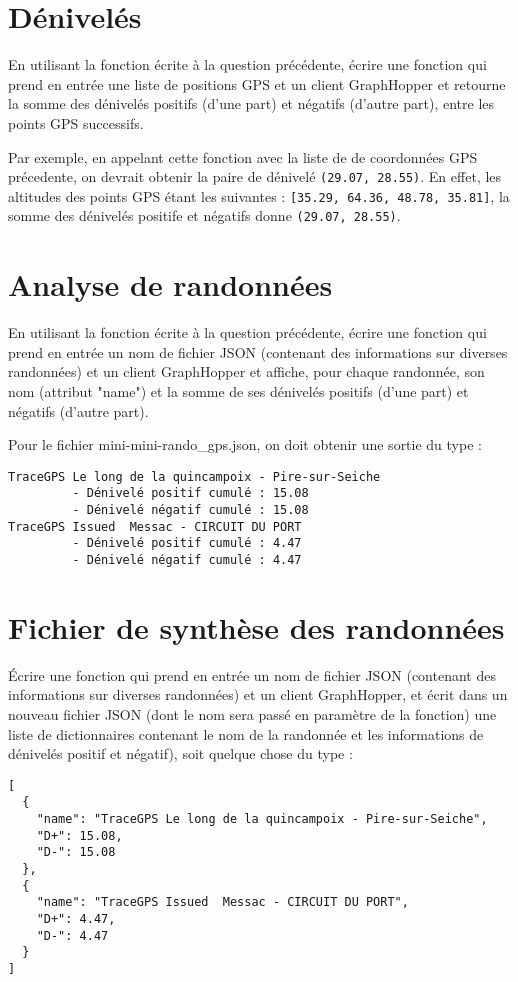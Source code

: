 \documentclass[11pt,a4paper]{article}
\begin{document}
\section{Dénivelés}

En utilisant la fonction écrite à la question précédente, écrire
une fonction qui prend en entrée une liste de positions GPS et un client GraphHopper et retourne la somme des dénivelés positifs (d’une part) et négatifs (d’autre part), entre les points GPS successifs. 

Par exemple, en appelant cette fonction avec la liste de de coordonnées GPS précedente, on devrait obtenir la paire de dénivelé \verb+(29.07, 28.55)+.
En effet, les altitudes des points GPS étant les suivantes :
\verb+[35.29, 64.36, 48.78, 35.81]+,  la somme des dénivelés positife et négatifs donne \verb+(29.07, 28.55)+.

\section{Analyse de randonnées}

En utilisant la fonction écrite à la question précédente, écrire une fonction qui prend en entrée un nom de fichier JSON (contenant des informations sur diverses randonnées) et un client GraphHopper et affiche, pour chaque randonnée, son nom (attribut "name") et la somme de ses dénivelés positifs (d’une part) et négatifs (d’autre part). 

Pour le fichier mini-mini-rando\_gps.json, on doit obtenir une sortie du type :
\begin{verbatim}
TraceGPS Le long de la quincampoix - Pire-sur-Seiche 
         - Dénivelé positif cumulé : 15.08
         - Dénivelé négatif cumulé : 15.08
TraceGPS Issued  Messac - CIRCUIT DU PORT 
         - Dénivelé positif cumulé : 4.47
         - Dénivelé négatif cumulé : 4.47
\end{verbatim}
\section{Fichier de synthèse des randonnées}

Écrire une fonction qui prend en entrée un nom de fichier JSON (contenant des informations sur diverses randonnées) et un client GraphHopper, et écrit dans un nouveau fichier JSON (dont le nom sera passé en paramètre de la fonction) une liste de dictionnaires contenant le nom de la randonnée et les informations de dénivelés positif et négatif), soit quelque chose du type :
\begin{verbatim}
[
  {
    "name": "TraceGPS Le long de la quincampoix - Pire-sur-Seiche",
    "D+": 15.08,
    "D-": 15.08
  },
  {
    "name": "TraceGPS Issued  Messac - CIRCUIT DU PORT",
    "D+": 4.47,
    "D-": 4.47
  }
]
\end{verbatim}
\end{document}
